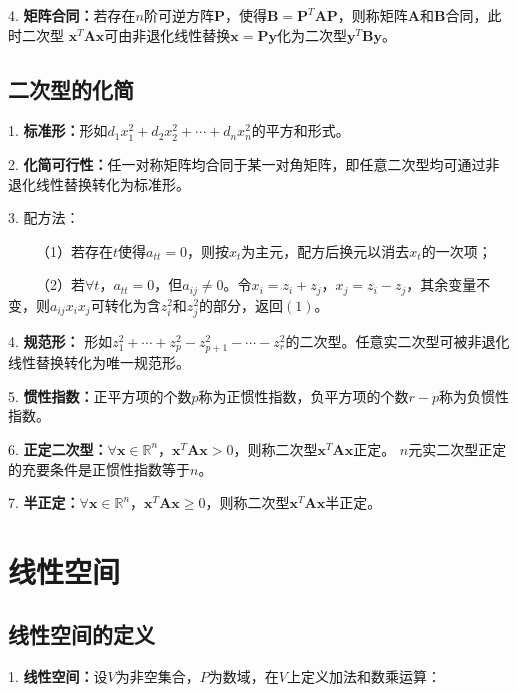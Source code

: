 4. \textbf{矩阵合同：}若存在$n$阶可逆方阵$\boldsymbol{P}$，使得$\boldsymbol{B}=\boldsymbol{P}^T\boldsymbol{A}\boldsymbol{P}$，则称矩阵$\boldsymbol{A}$和$\boldsymbol{B}$合同，此时二次型
$\boldsymbol{x}^T\boldsymbol{A}\boldsymbol{x}$可由非退化线性替换$\boldsymbol{x}=\boldsymbol{P}\boldsymbol{y}$化为二次型$\boldsymbol{y}^T\boldsymbol{B}\boldsymbol{y}$。

\subsection{二次型的化简}

1. \textbf{标准形：}形如$d_1x_1^2+d_2x_2^2+\cdots+d_nx_n^2$的平方和形式。

2. \textbf{化简可行性：}任一对称矩阵均合同于某一对角矩阵，即任意二次型均可通过非退化线性替换转化为标准形。

3. 配方法：

~~~~（1）若存在$t$使得$a_{tt}=0$，则按$x_t$为主元，配方后换元以消去$x_t$的一次项；

~~~~（2）若$\forall t$，$a_{tt}=0$，但$a_{ij}\neq 0$。令$x_i=z_i+z_j$，$x_j=z_i-z_j$，其余变量不变，则$a_{ij}x_ix_j$可转化为含$z_i^2$和$z_j^2$的部分，返回$(1)$。

4. \textbf{规范形：} 形如$z_1^2+\cdots+z_p^2-z_{p+1}^2-\cdots-z_r^2$的二次型。任意实二次型可被非退化线性替换转化为唯一规范形。

5. \textbf{惯性指数：}正平方项的个数$p$称为正惯性指数，负平方项的个数$r-p$称为负惯性指数。

6. \textbf{正定二次型：}$\forall \boldsymbol{x} \in \mathbb{R}^n$，$\boldsymbol{x}^T\boldsymbol{A}\boldsymbol{x}>0$，则称二次型$\boldsymbol{x}^T\boldsymbol{A}\boldsymbol{x}$正定。
$n$元实二次型正定的充要条件是正惯性指数等于$n$。

7. \textbf{半正定：}$\forall \boldsymbol{x} \in \mathbb{R}^n$，$\boldsymbol{x}^T\boldsymbol{A}\boldsymbol{x}\geqslant 0$，则称二次型$\boldsymbol{x}^T\boldsymbol{A}\boldsymbol{x}$半正定。

\section{线性空间}

\subsection{线性空间的定义}

1. \textbf{线性空间：}设$V$为非空集合，$P$为数域，在$V$上定义加法和数乘运算：

